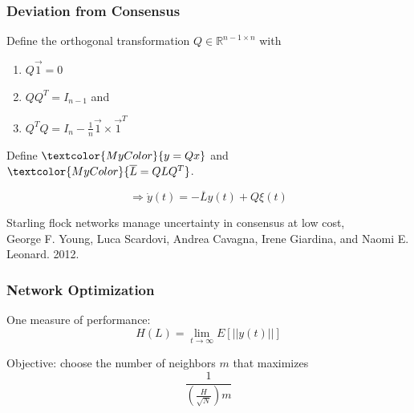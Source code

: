 \documentclass{beamer}
\newcommand{\R}{\mathbb{R}}
\begin{document}
\begin{frame}
\frametitle{Deviation from Consensus}
Define the orthogonal transformation $Q\in\R^{n-1\times n}$ with 
\begin{enumerate}
\item $Q\vec{1}=0$
\item $QQ^T=I_{n-1}$ and 
\item $Q^TQ=I_n-\frac{1}{n}\vec{1}\times \vec{1}^T$
\end{enumerate}
Define $\textcolor{MyColor}{y=Qx}$ and $\textcolor{MyColor}{\overline{L}=QLQ^T}$.

$$\Longrightarrow \dot{y}(t)=-\overline{L}y(t)+Q\xi(t)$$

\vspace{50pt}\tiny{Starling flock networks manage uncertainty in consensus at low cost, \\George F. Young, Luca Scardovi, Andrea Cavagna, Irene Giardina, and Naomi E. Leonard. 2012.}

\end{frame}

\begin{frame}
\frametitle{Network Optimization}
One measure of performance:
$$H(L)=\lim_{t\to\infty}E[||y(t)||]$$

Objective: choose the number of neighbors $m$ that maximizes $$\frac{1}{\left(\frac{H}{\sqrt{N}}\right)m}$$

\end{frame}
\end{document}
